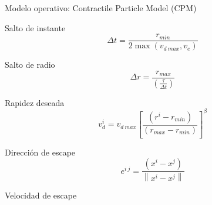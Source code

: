 \begin{frame}{Modelo operativo: Contractile Particle Model (CPM)}
    \small{
    \begin{center}
        \begin{minipage}[t]{0.30\textwidth}
            \begin{block}{Salto de instante}
                \begin{equation*}
                    \Delta t = \frac{r_{min}}{2 \max (v_{d\ max}, v_e)}
                \end{equation*}
            \end{block}
        \end{minipage}
        \hfill
        \begin{minipage}[t]{0.30\textwidth}
            \begin{block}{Salto de radio}
                \begin{equation*}
                    \Delta r = \frac{r_{max}}{\left( \frac{\tau}{\Delta t} \right)}
                \end{equation*}
            \end{block}
        \end{minipage}
        \hfill
        \begin{minipage}[t]{0.30\textwidth}
            \begin{block}{Rapidez deseada}
                \begin{equation*}
                    v_d^i = v_{d\ max} \left[ \frac{(r^i - r_{min})}{(r_{max} - r_{min})} \right]^{\beta}
                \end{equation*}
            \end{block}
        \end{minipage}
    \end{center}
    \begin{center}
        \begin{minipage}[t]{0.30\textwidth}
            \begin{block}{Dirección de escape}
                \begin{equation*}
                    e^{i\ j} = \frac{(x^i - x^j)}{\left\| x^i - x^j \right\|}
                \end{equation*}
            \end{block}
        \end{minipage}
        \hfill
        \begin{minipage}[t]{0.30\textwidth}
            \begin{block}{Velocidad de escape}

\end{block}
\end{minipage}
\end{center}}
\end{frame}
